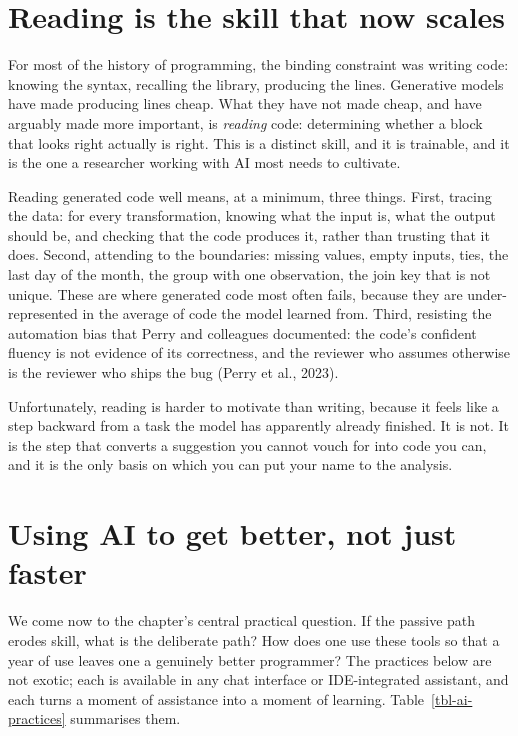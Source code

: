 \documentclass[
  letterpaper,
  11pt]{scrbook}
\begin{document}
\section{Reading is the skill that now
scales}\label{reading-is-the-skill-that-now-scales}

For most of the history of programming, the binding constraint was
writing code: knowing the syntax, recalling the library, producing the
lines. Generative models have made producing lines cheap. What they have
not made cheap, and have arguably made more important, is \emph{reading}
code: determining whether a block that looks right actually is right.
This is a distinct skill, and it is trainable, and it is the one a
researcher working with AI most needs to cultivate.

Reading generated code well means, at a minimum, three things. First,
tracing the data: for every transformation, knowing what the input is,
what the output should be, and checking that the code produces it,
rather than trusting that it does. Second, attending to the boundaries:
missing values, empty inputs, ties, the last day of the month, the group
with one observation, the join key that is not unique. These are where
generated code most often fails, because they are under-represented in
the average of code the model learned from. Third, resisting the
automation bias that Perry and colleagues documented: the code's
confident fluency is not evidence of its correctness, and the reviewer
who assumes otherwise is the reviewer who ships the bug (Perry et al.,
2023).

Unfortunately, reading is harder to motivate than writing, because it
feels like a step backward from a task the model has apparently already
finished. It is not. It is the step that converts a suggestion you
cannot vouch for into code you can, and it is the only basis on which
you can put your name to the analysis.

\section{Using AI to get better, not just
faster}\label{using-ai-to-get-better-not-just-faster}

We come now to the chapter's central practical question. If the passive
path erodes skill, what is the deliberate path? How does one use these
tools so that a year of use leaves one a genuinely better programmer?
The practices below are not exotic; each is available in any chat
interface or IDE-integrated assistant, and each turns a moment of
assistance into a moment of learning. Table~\ref{tbl-ai-practices}
summarises them.
\end{document}
